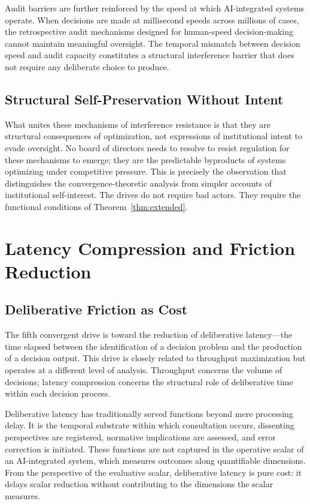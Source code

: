 \documentclass[12pt, oneside]{book}
\theoremstyle{plain}
\theoremstyle{definition}
\theoremstyle{remark}
\theoremstyle{definition}
\begin{document}
Audit barriers are further reinforced by the speed at which AI-integrated systems
operate. When decisions are made at millisecond speeds across millions of cases,
the retrospective audit mechanisms designed for human-speed decision-making cannot
maintain meaningful oversight. The temporal mismatch between decision speed and audit
capacity constitutes a structural interference barrier that does not require any
deliberate choice to produce.

\section{Structural Self-Preservation Without Intent}

What unites these mechanisms of interference resistance is that they are structural
consequences of optimization, not expressions of institutional intent to evade
oversight. No board of directors needs to resolve to resist regulation for these
mechanisms to emerge; they are the predictable byproducts of systems optimizing
under competitive pressure. This is precisely the observation that distinguishes the
convergence-theoretic analysis from simpler accounts of institutional self-interest.
The drives do not require bad actors. They require the functional conditions of
Theorem~\ref{thm:extended}.

\chapter{Latency Compression and Friction Reduction}
\label{ch:latency}

\section{Deliberative Friction as Cost}

The fifth convergent drive is toward the reduction of deliberative latency---the
time elapsed between the identification of a decision problem and the production of
a decision output. This drive is closely related to throughput maximization but
operates at a different level of analysis. Throughput concerns the volume of decisions;
latency compression concerns the structural role of deliberative time within each
decision process.

Deliberative latency has traditionally served functions beyond mere processing delay.
It is the temporal substrate within which consultation occurs, dissenting perspectives
are registered, normative implications are assessed, and error correction is initiated.
These functions are not captured in the operative scalar of an AI-integrated system,
which measures outcomes along quantifiable dimensions. From the perspective of the
evaluative scalar, deliberative latency is pure cost: it delays scalar reduction
without contributing to the dimensions the scalar measures.
\end{document}
